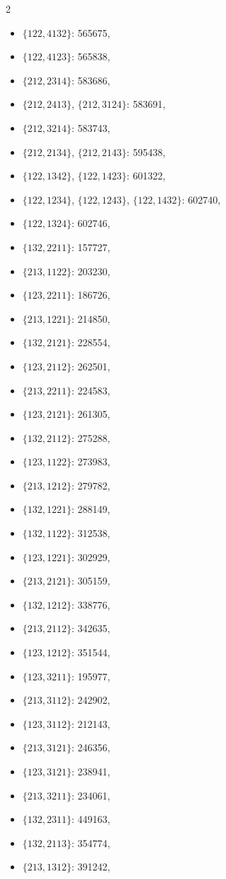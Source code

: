 \documentclass[11pt]{amsart}
\theoremstyle{plain}
\theoremstyle{definition}
\begin{document}
{\begin{multicols}{2}
\begin{itemize}
\item $\{122,4132\}$: 565675,
\item $\{122,4123\}$: 565838,
\item $\{212,2314\}$: 583686,
\item[$\blacksquare$] $\{212,2413\}$, $\{212,3124\}$: 583691,
\item $\{212,3214\}$: 583743,
\item[$\blacksquare$] $\{212,2134\}$, $\{212,2143\}$: 595438,
\item[$\blacksquare$] $\{122,1342\}$, $\{122,1423\}$: 601322,
\item[$\blacksquare$] $\{122,1234\}$, $\{122,1243\}$, $\{122,1432\}$: 602740,
\item $\{122,1324\}$: 602746,
\item $\{132,2211\}$: 157727,
\item $\{213,1122\}$: 203230,
\item $\{123,2211\}$: 186726,
\item $\{213,1221\}$: 214850,
\item $\{132,2121\}$: 228554,
\item $\{123,2112\}$: 262501,
\item $\{213,2211\}$: 224583,
\item $\{123,2121\}$: 261305,
\item $\{132,2112\}$: 275288,
\item $\{123,1122\}$: 273983,
\item $\{213,1212\}$: 279782,
\item $\{132,1221\}$: 288149,
\item $\{132,1122\}$: 312538,
\item $\{123,1221\}$: 302929,
\item $\{213,2121\}$: 305159,
\item $\{132,1212\}$: 338776,
\item $\{213,2112\}$: 342635,
\item $\{123,1212\}$: 351544,
\item $\{123,3211\}$: 195977,
\item $\{213,3112\}$: 242902,
\item $\{123,3112\}$: 212143,
\item $\{213,3121\}$: 246356,
\item $\{123,3121\}$: 238941,
\item $\{213,3211\}$: 234061,
\item $\{132,2311\}$: 449163,
\item $\{132,2113\}$: 354774,
\item $\{213,1312\}$: 391242,

\end{itemize}
\end{multicols}}
\end{document}
